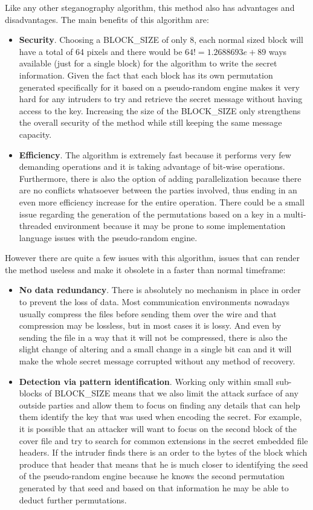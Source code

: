 \begin{multicols*}{2}
Like any other steganography algorithm, this method also has advantages and disadvantages. The main benefits of this algorithm are:
\begin{itemize}
  \item \textbf{Security}. Choosing a BLOCK\_SIZE of only 8, each normal sized block will have a total of 64 pixels and there would be $64! = 1.2688693e+89$ ways available (just for a single block) for the algorithm to write the secret information. Given the fact that each block has its own permutation generated specifically for it based on a pseudo-random engine makes it very hard for any intruders to try and retrieve the secret message without having access to the key. Increasing the size of the BLOCK\_SIZE only strengthens the overall security of the method while still keeping the same message capacity.
 \item \textbf{Efficiency}. The algorithm is extremely fast because it performs very few demanding operations and it is taking advantage of bit-wise operations. Furthermore, there is also the option of adding parallelization because there are no conflicts whatsoever between the parties involved, thus ending in an even more efficiency increase for the entire operation. There could be a small issue regarding the generation of the permutations based on a key in a multi-threaded environment because it may be prone to some implementation language issues with the pseudo-random engine.
\end{itemize}
However there are quite a few issues with this algorithm, issues that can render the method useless and make it obsolete in a faster than normal timeframe:
\begin{itemize}
  \item \textbf{No data redundancy}. There is absolutely no mechanism in place in order to prevent the loss of data. Most communication environments nowadays usually compress the files before sending them over the wire and that compression may be lossless, but in most cases it is lossy. And even by sending the file in a way that it will not be compressed, there is also the slight change of altering and a small change in a single bit can and it will make the whole secret message corrupted without any method of recovery.
  \item \textbf{Detection via pattern identification}. Working only within small sub-blocks of BLOCK\_SIZE means that we also limit the attack surface of any outside parties and allow them to focus on finding any details that can help them identify the key that was used when encoding the secret. For example, it is possible that an attacker will want to focus on the second block of the cover file and try to search for common extensions in the secret embedded file headers. If the intruder finds there is an order to the bytes of the block which produce that header that means that he is much closer to identifying the seed of the pseudo-random engine because he knows the second permutation generated by that seed and based on that information he may be able to deduct further permutations.

\end{itemize}
\end{multicols*}

